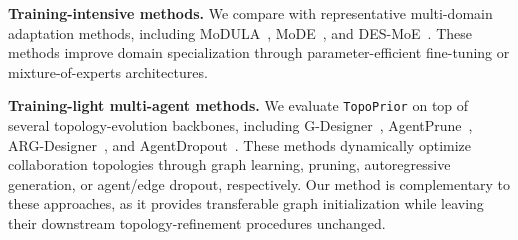 \documentclass[lettersize,journal]{IEEEtran}
\theoremstyle{plain}
\begin{document}
\noindent\textbf{Training-intensive methods.}
We compare with representative multi-domain adaptation methods, including MoDULA~\cite{DBLP:conf/emnlp/0011LDCGRZJJZCY24}, MoDE~\cite{DBLP:journals/corr/abs-2410-10181}, and DES-MoE~\cite{DBLP:journals/corr/abs-2509-16882}. These methods improve domain specialization through parameter-efficient fine-tuning or mixture-of-experts architectures.

\noindent\textbf{Training-light multi-agent methods.}
We evaluate \texttt{TopoPrior} on top of several topology-evolution backbones, including G-Designer~\cite{DBLP:conf/icml/ZhangYSWYF00C25}, AgentPrune~\cite{DBLP:conf/iclr/ZhangYLYWWCY025}, ARG-Designer~\cite{DBLP:conf/aaai/LiLWZP26}, and AgentDropout~\cite{DBLP:conf/acl/WangW00Z0025}. These methods dynamically optimize collaboration topologies through graph learning, pruning, autoregressive generation, or agent/edge dropout, respectively. Our method is complementary to these approaches, as it provides transferable graph initialization while leaving their downstream topology-refinement procedures unchanged.
\end{document}
